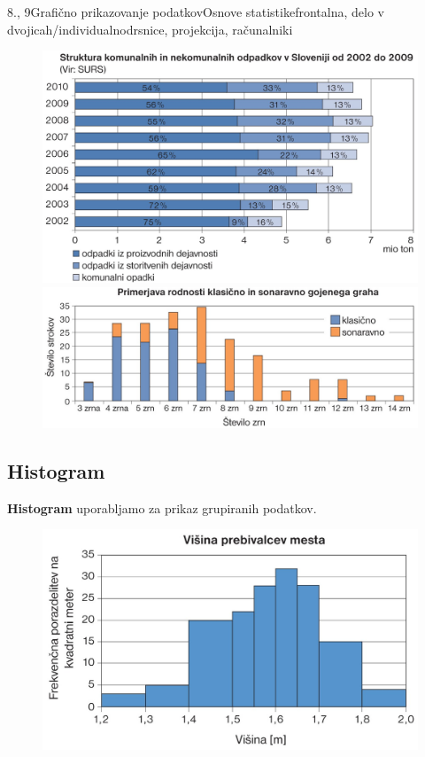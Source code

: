 \begin{priprava}{8., 9}{}{Grafično prikazovanje podatkov}{Osnove statistike}{frontalna, delo v dvojicah/individualno}{drsnice, projekcija, računalniki}
\begin{figure}[H]
            \includegraphics[scale=0.22]{../../Slike_in_skice/1097.jpg} 
            \includegraphics[scale=0.21]{../../Slike_in_skice/1096.jpg}
            
        \end{figure}
    




\newpage

\subsection*{Histogram}

    \textbf{Histogram} uporabljamo za prikaz grupiranih podatkov. 

        \begin{figure}[H]
            \includegraphics[scale=0.33]{../../Slike_in_skice/1098.jpg}
        \end{figure}



\end{priprava}

